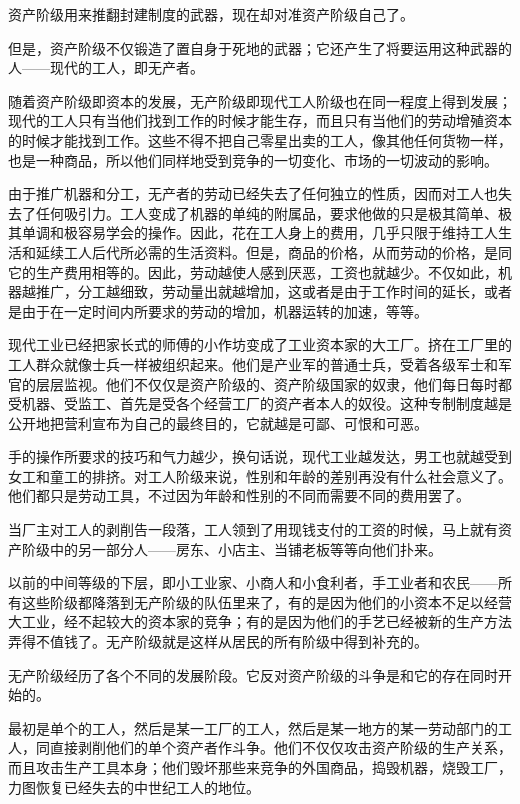 \documentclass[10pt, UTF8]{book} %
\begin{document}
资产阶级用来推翻封建制度的武器，现在却对准资产阶级自己了。

但是，资产阶级不仅锻造了置自身于死地的武器；它还产生了将要运用这种武器的人——现代的工人，即无产者。

随着资产阶级即资本的发展，无产阶级即现代工人阶级也在同一程度上得到发展；现代的工人只有当他们找到工作的时候才能生存，而且只有当他们的劳动增殖资本的时候才能找到工作。这些不得不把自己零星出卖的工人，像其他任何货物一样，也是一种商品，所以他们同样地受到竞争的一切变化、市场的一切波动的影响。

由于推广机器和分工，无产者的劳动已经失去了任何独立的性质，因而对工人也失去了任何吸引力。工人变成了机器的单纯的附属品，要求他做的只是极其简单、极其单调和极容易学会的操作。因此，花在工人身上的费用，几乎只限于维持工人生活和延续工人后代所必需的生活资料。但是，商品的价格，从而劳动的价格，是同它的生产费用相等的。因此，劳动越使人感到厌恶，工资也就越少。不仅如此，机器越推广，分工越细致，劳动量出就越增加，这或者是由于工作时间的延长，或者是由于在一定时间内所要求的劳动的增加，机器运转的加速，等等。

现代工业已经把家长式的师傅的小作坊变成了工业资本家的大工厂。挤在工厂里的工人群众就像士兵一样被组织起来。他们是产业军的普通士兵，受着各级军士和军官的层层监视。他们不仅仅是资产阶级的、资产阶级国家的奴隶，他们每日每时都受机器、受监工、首先是受各个经营工厂的资产者本人的奴役。这种专制制度越是公开地把营利宣布为自己的最终目的，它就越是可鄙、可恨和可恶。

手的操作所要求的技巧和气力越少，换句话说，现代工业越发达，男工也就越受到女工和童工的排挤。对工人阶级来说，性别和年龄的差别再没有什么社会意义了。他们都只是劳动工具，不过因为年龄和性别的不同而需要不同的费用罢了。

当厂主对工人的剥削告一段落，工人领到了用现钱支付的工资的时候，马上就有资产阶级中的另一部分人——房东、小店主、当铺老板等等向他们扑来。

以前的中间等级的下层，即小工业家、小商人和小食利者，手工业者和农民——所有这些阶级都降落到无产阶级的队伍里来了，有的是因为他们的小资本不足以经营大工业，经不起较大的资本家的竞争；有的是因为他们的手艺已经被新的生产方法弄得不值钱了。无产阶级就是这样从居民的所有阶级中得到补充的。

无产阶级经历了各个不同的发展阶段。它反对资产阶级的斗争是和它的存在同时开始的。

最初是单个的工人，然后是某一工厂的工人，然后是某一地方的某一劳动部门的工人，同直接剥削他们的单个资产者作斗争。他们不仅仅攻击资产阶级的生产关系，而且攻击生产工具本身；他们毁坏那些来竞争的外国商品，捣毁机器，烧毁工厂，力图恢复已经失去的中世纪工人的地位。
\end{document}

